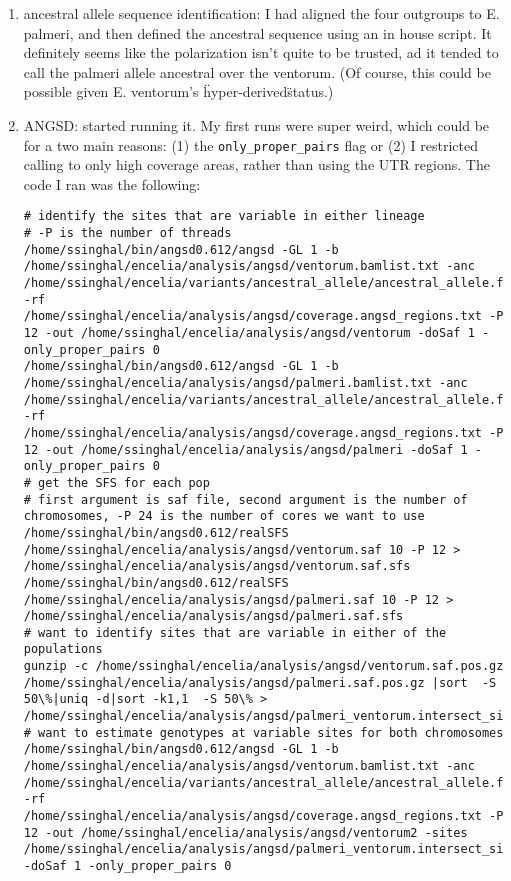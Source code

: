 \documentclass[idxtotoc,hyperref,openany,oneside]{labbook} %
\begin{document}
\begin{enumerate}
\item ancestral allele sequence identification: I had aligned the four outgroups to E. palmeri, and then defined the ancestral sequence using an in house script. It definitely seems like the polarization isn't quite to be trusted, ad it tended to call the palmeri allele ancestral over the ventorum. (Of course, this could be possible given E. ventorum's \"hyper-derived\" status.)
\item ANGSD: started running it. My first runs were super weird, which could be for a two main reasons: (1) the \verb+only_proper_pairs+ flag or (2) I restricted calling to only high coverage areas, rather than using the UTR regions. The code I ran was the following:
\begin{verbatim}
# identify the sites that are variable in either lineage
# -P is the number of threads
/home/ssinghal/bin/angsd0.612/angsd -GL 1 -b /home/ssinghal/encelia/analysis/angsd/ventorum.bamlist.txt -anc /home/ssinghal/encelia/variants/ancestral_allele/ancestral_allele.fa -rf /home/ssinghal/encelia/analysis/angsd/coverage.angsd_regions.txt -P 12 -out /home/ssinghal/encelia/analysis/angsd/ventorum -doSaf 1 -only_proper_pairs 0
/home/ssinghal/bin/angsd0.612/angsd -GL 1 -b /home/ssinghal/encelia/analysis/angsd/palmeri.bamlist.txt -anc /home/ssinghal/encelia/variants/ancestral_allele/ancestral_allele.fa -rf /home/ssinghal/encelia/analysis/angsd/coverage.angsd_regions.txt -P 12 -out /home/ssinghal/encelia/analysis/angsd/palmeri -doSaf 1 -only_proper_pairs 0
# get the SFS for each pop
# first argument is saf file, second argument is the number of chromosomes, -P 24 is the number of cores we want to use
/home/ssinghal/bin/angsd0.612/realSFS /home/ssinghal/encelia/analysis/angsd/ventorum.saf 10 -P 12 > /home/ssinghal/encelia/analysis/angsd/ventorum.saf.sfs
/home/ssinghal/bin/angsd0.612/realSFS /home/ssinghal/encelia/analysis/angsd/palmeri.saf 10 -P 12 > /home/ssinghal/encelia/analysis/angsd/palmeri.saf.sfs
# want to identify sites that are variable in either of the populations
gunzip -c /home/ssinghal/encelia/analysis/angsd/ventorum.saf.pos.gz /home/ssinghal/encelia/analysis/angsd/palmeri.saf.pos.gz |sort  -S 50\%|uniq -d|sort -k1,1  -S 50\% > /home/ssinghal/encelia/analysis/angsd/palmeri_ventorum.intersect_sites.txt
# want to estimate genotypes at variable sites for both chromosomes
/home/ssinghal/bin/angsd0.612/angsd -GL 1 -b /home/ssinghal/encelia/analysis/angsd/ventorum.bamlist.txt -anc /home/ssinghal/encelia/variants/ancestral_allele/ancestral_allele.fa -rf /home/ssinghal/encelia/analysis/angsd/coverage.angsd_regions.txt -P 12 -out /home/ssinghal/encelia/analysis/angsd/ventorum2 -sites /home/ssinghal/encelia/analysis/angsd/palmeri_ventorum.intersect_sites.txt -doSaf 1 -only_proper_pairs 0

\end{verbatim}
\end{enumerate}
\end{document}
